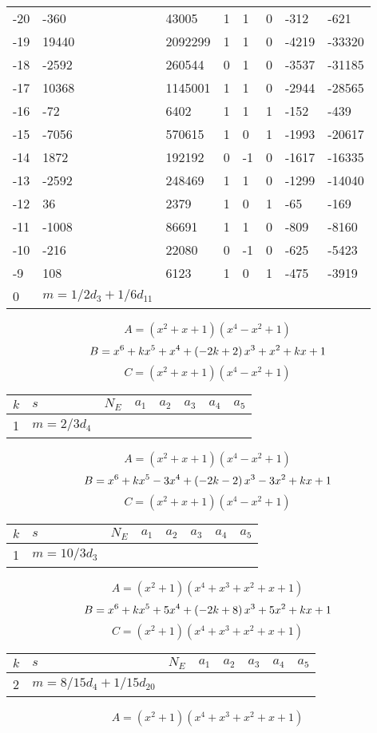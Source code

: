 \documentclass{amsart}
\begin{document}
\begin{longtable}{|l|l|l|lllll|}
-20&-360&43005&1&1&0&-312&-621\\
-19&19440&2092299&1&1&0&-4219&-33320\\
-18&-2592&260544&0&1&0&-3537&-31185\\
-17&10368&1145001&1&1&0&-2944&-28565\\
-16&-72&6402&1&1&1&-152&-439\\
-15&-7056&570615&1&0&1&-1993&-20617\\
-14&1872&192192&0&-1&0&-1617&-16335\\
-13&-2592&248469&1&1&0&-1299&-14040\\
-12&36&2379&1&0&1&-65&-169\\
-11&-1008&86691&1&1&0&-809&-8160\\
-10&-216&22080&0&-1&0&-625&-5423\\
-9&108&6123&1&0&1&-475&-3919\\
0&$m=1/2d_{3}+1/6d_{11}$&&\multicolumn{5}{c|}{}\\
\hline
\end{longtable}
$$A=(x^2
 + x
 + 1)(x^4
 - x^2
 + 1)$$
$$B=x^6
 + k\*x^5
 + x^4
 + \left(-2\*k
 + 2\right) \*x^3
 + x^2
 + k\*x
 + 1$$
$$C=(x^2
 + x
 + 1)(x^4
 - x^2
 + 1)$$
\begin{longtable}{|l|l|l|lllll|}
\hline
$k$ & $s$ & $N_E$ & $a_1$ & $a_2$ & $a_3$ & $a_4$ & $a_5$\\
\hline
1&$m=2/3d_{4}$&&\multicolumn{5}{c|}{}\\
\hline
\end{longtable}
$$A=(x^2
 + x
 + 1)(x^4
 - x^2
 + 1)$$
$$B=x^6
 + k\*x^5
 - 3\*x^4
 + \left(-2\*k
 - 2\right) \*x^3
 - 3\*x^2
 + k\*x
 + 1$$
$$C=(x^2
 + x
 + 1)(x^4
 - x^2
 + 1)$$
\begin{longtable}{|l|l|l|lllll|}
\hline
$k$ & $s$ & $N_E$ & $a_1$ & $a_2$ & $a_3$ & $a_4$ & $a_5$\\
\hline
1&$m=10/3d_{3}$&&\multicolumn{5}{c|}{}\\
\hline
\end{longtable}
$$A=(x^2
 + 1)(x^4
 + x^3
 + x^2
 + x
 + 1)$$
$$B=x^6
 + k\*x^5
 + 5\*x^4
 + \left(-2\*k
 + 8\right) \*x^3
 + 5\*x^2
 + k\*x
 + 1$$
$$C=(x^2
 + 1)(x^4
 + x^3
 + x^2
 + x
 + 1)$$
\begin{longtable}{|l|l|l|lllll|}
\hline
$k$ & $s$ & $N_E$ & $a_1$ & $a_2$ & $a_3$ & $a_4$ & $a_5$\\
\hline
2&$m=8/15d_{4}+1/15d_{20}$&&\multicolumn{5}{c|}{}\\
\hline
\end{longtable}
$$A=(x^2
 + 1)(x^4
 + x^3
 + x^2
 + x
 + 1)$$
\end{document}
